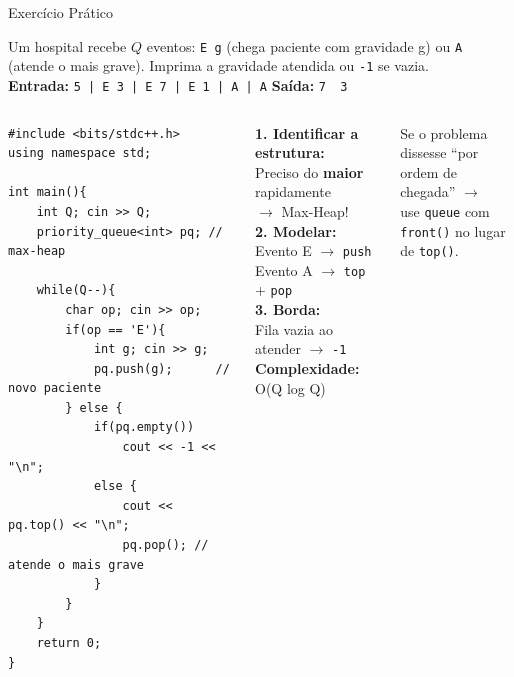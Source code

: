 \documentclass[aspectratio=169,10pt]{beamer}
\begin{document}
\begin{frame}[fragile,shrink=3]{Exercício Prático}
  \begin{tcolorbox}[caixaRoxa,title={Problema: Hospital de Campanha}]
    \footnotesize
    Um hospital recebe $Q$ eventos: \texttt{E g} (chega paciente com gravidade g)
    ou \texttt{A} (atende o mais grave). Imprima a gravidade atendida ou \texttt{-1} se vazia.\\[2pt]
    \textbf{Entrada:} \texttt{5 | E 3 | E 7 | E 1 | A | A}
    \quad\textbf{Saída:} \texttt{7\ \ 3}
  \end{tcolorbox}
  \vspace{0.06cm}
  \begin{columns}[t]
      \begin{tcolorbox}[caixaCodigo]
        \begin{lstlisting}[style=cppsmall]
#include <bits/stdc++.h>
using namespace std;

int main(){
    int Q; cin >> Q;
    priority_queue<int> pq; // max-heap

    while(Q--){
        char op; cin >> op;
        if(op == 'E'){
            int g; cin >> g;
            pq.push(g);      // novo paciente
        } else {
            if(pq.empty())
                cout << -1 << "\n";
            else {
                cout << pq.top() << "\n";
                pq.pop(); // atende o mais grave
            }
        }
    }
    return 0;
}
        \end{lstlisting}
      \end{tcolorbox}
      \begin{tcolorbox}[caixaAmarelo,title={Estrategia}]
        \footnotesize
        \textbf{1. Identificar a estrutura:}\\
        Preciso do \textbf{maior} rapidamente\\
        $\to$ Max-Heap!\\[4pt]
        \textbf{2. Modelar:}\\
        Evento E $\to$ \texttt{push}\\
        Evento A $\to$ \texttt{top} + \texttt{pop}\\[4pt]
        \textbf{3. Borda:}\\
        Fila vazia ao atender $\to$ \texttt{-1}\\[4pt]
        \textbf{Complexidade:} O(Q log Q)
      \end{tcolorbox}
      \vspace{0.08cm}
      \begin{tcolorbox}[caixaVerde,title={Variação com Queue}]
        \footnotesize
        Se o problema dissesse ``por\\
        ordem de chegada'' $\to$\\
        use \texttt{queue} com\\
        \texttt{front()} no lugar de \texttt{top()}.
      \end{tcolorbox}
  \end{columns}
\end{frame}
\end{document}
